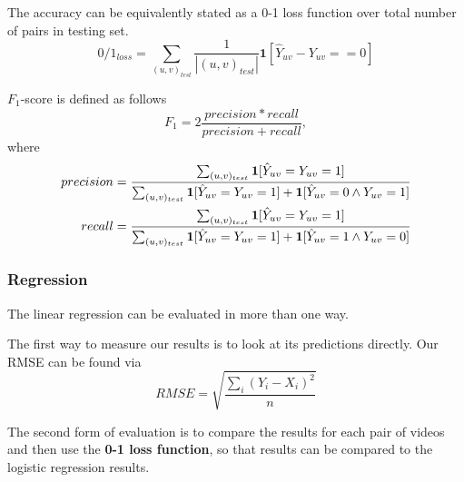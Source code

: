	The accuracy can be equivalently stated as a 0-1 loss function over total number of pairs in testing set.
	\begin{equation}
		0/1_{loss} = \sum_{(u, v)_{test}} \frac{1}{|(u,v)_{test}|} \textbf{1}[\hat{Y}_{uv} - Y_{uv} == 0]
	\end{equation}
	
	$F_1$-score is defined as follows
	\begin{equation}
		F_1 = 2\frac{precision * recall}{precision + recall}, 
	\end{equation}
	where 
	\begin{align}
	precision &= \frac{\sum_{(u, v)_{test}} \textbf{1}[\hat{Y}_{uv} = Y_{uv} = 1]}{\sum_{(u, v)_{test}} \textbf{1}[\hat{Y}_{uv} = Y_{uv} = 1] + \textbf{1}[\hat{Y}_{uv} = 0 \wedge Y_{uv} = 1]} \\ \notag	
	recall &= \frac{\sum_{(u, v)_{test}} \textbf{1}[\hat{Y}_{uv} = Y_{uv} = 1]}{\sum_{(u, v)_{test}} \textbf{1}[\hat{Y}_{uv} = Y_{uv} = 1] + \textbf{1}[\hat{Y}_{uv} = 1 \wedge Y_{uv} = 0]}
	\end{align}
	
	\subsubsection{Regression}
	The linear regression can be evaluated in more than one way.
	
	The first way to measure our results is to look at its predictions directly.  Our RMSE can be found via
	\begin{equation}
		RMSE = \sqrt{\frac{\sum_{i} (Y_i-X_i)^2}{n}}
	\end{equation}
	
	The second form of evaluation is to compare the results for each pair of videos and then use the \textbf{0-1 loss function}, so that results can be compared to the logistic regression results.

